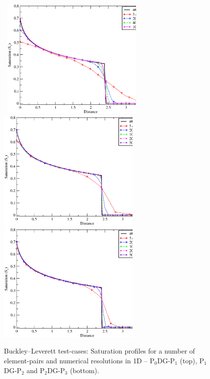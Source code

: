 \begin{figure}[h]
\vbox{\hbox{\hspace{2.5cm}
    \includegraphics[width=0.62\textwidth]{diagrams/BL_1d_P0DGP1_convergence.eps}}
\vspace{-.0cm}\hbox{\hspace{2.5cm}
    \includegraphics[width=0.62\textwidth]{diagrams/BL_1d_P1DGP2_convergence.eps}}
\vspace{-.0cm}\hbox{\hspace{2.5cm}
    \includegraphics[width=0.62\textwidth]{diagrams/BL_1d_P2DGP3_convergence.eps}}}
    \caption{Buckley--Leverett test-cases: Saturation profiles for a number of element-pairs and numerical resolutions in 1D -- P$_{0}$DG-P$_{1}$ (top), P$_{1}$DG-P$_{2}$ and P$_{2}$DG-P$_{3}$ (bottom).\label{fig:BL_profiles}}
\end{figure}

